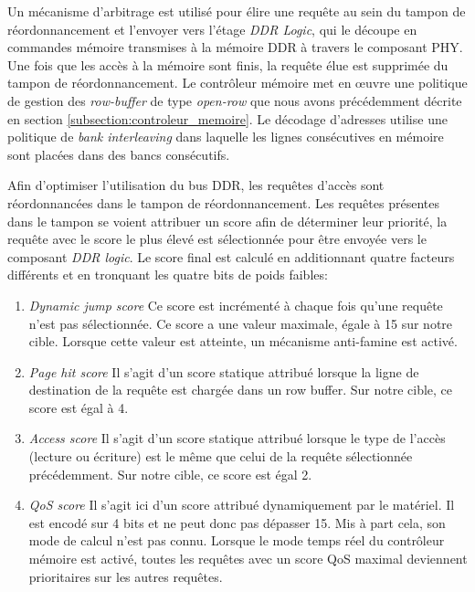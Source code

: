         Un mécanisme d'arbitrage est utilisé pour élire une requête au sein du tampon de réordonnancement et l'envoyer vers l'étage \emph{DDR Logic}, qui le découpe en commandes mémoire transmises à la mémoire DDR à travers le composant PHY. Une fois que les accès à la mémoire sont finis, la requête élue est supprimée du tampon de réordonnancement.
        Le contrôleur mémoire met en œuvre une politique de gestion des \emph{row-buffer} de type \emph{open-row} que nous avons précédemment décrite en section \ref{subsection:controleur_memoire}.
        Le décodage d'adresses utilise une politique de \emph{bank interleaving} dans laquelle les lignes consécutives en mémoire sont placées dans des bancs consécutifs.
        
        Afin d'optimiser l'utilisation du bus DDR, les requêtes d'accès sont réordonnancées dans le tampon de réordonnancement.
        Les requêtes présentes dans le tampon se voient attribuer un score afin de déterminer leur priorité, la requête avec le score le plus élevé est sélectionnée pour être envoyée vers le composant \emph{DDR logic}.
        Le score final est calculé en additionnant quatre facteurs différents et en tronquant les quatre bits de poids faibles:
        \begin{enumerate}
            \item \emph{Dynamic jump score} Ce score est incrémenté à chaque fois qu'une requête n'est pas sélectionnée.
            Ce score a une valeur maximale, égale à 15 sur notre cible.
            Lorsque cette valeur est atteinte, un mécanisme anti-famine est activé.
            
            \item \emph{Page hit score} Il s'agit d'un score statique attribué lorsque la ligne de destination de la requête est chargée dans un row buffer.
            Sur notre cible, ce score est égal à 4.
            
            \item \emph{Access score} Il s'agit d'un score statique attribué lorsque le type de l'accès (lecture ou écriture) est le même que celui de la requête sélectionnée précédemment.
            Sur notre cible, ce score est égal 2.

            \item \emph{QoS score} Il s'agit ici d'un score attribué dynamiquement par le matériel. Il est encodé sur 4 bits et ne peut donc pas dépasser 15. Mis à part cela, son mode de calcul n'est pas connu. Lorsque le mode temps réel du contrôleur mémoire est activé, toutes les requêtes avec un score QoS maximal deviennent prioritaires sur les autres requêtes.
        \end{enumerate}

